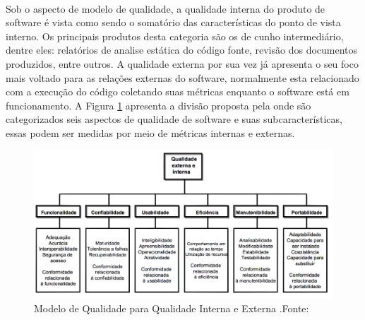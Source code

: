 \\ Sob o aspecto de modelo de qualidade, a qualidade interna do produto de software é vista como sendo o somatório das características do ponto de vista interno. Os principais produtos desta categoria são os de cunho intermediário, dentre eles: relatórios de analise estática do código fonte, revisão dos documentos produzidos, entre outros. A qualidade externa por sua vez já apresenta o seu foco mais voltado para as relações externas do software, normalmente esta relacionado com a execução do código coletando suas métricas enquanto o software está em funcionamento. A Figura \ref{img:modelo_qualidade} apresenta a divisão proposta pela \cite{_nbr_2016} onde são categorizados seis aspectos de qualidade de software e suas subcaracterísticas, essas podem ser medidas por meio de métricas internas e externas. 
 \graphicspath{{figuras/}}
\begin{figure}
\centering
\includegraphics[scale=0.50]{Modelo_de_Qualidade}
\caption{Modelo de Qualidade para Qualidade Interna e Externa .Fonte:\cite{_nbr_2016}}
\label{img:modelo_qualidade}
\end{figure}
 